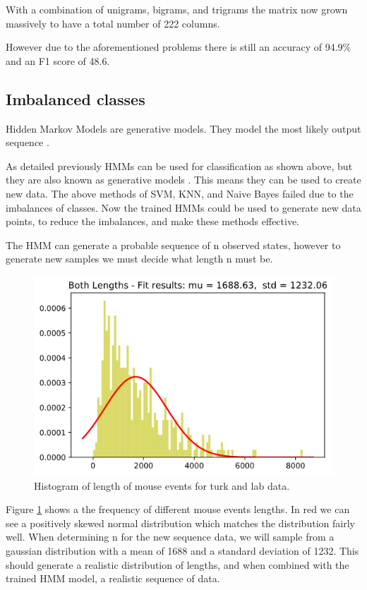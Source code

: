 \documentclass{article}
\begin{document}
With a combination of unigrams, bigrams, and trigrams the matrix now grown massively to have a total number of 222 columns.

However due to the aforementioned problems there is still an accuracy of 94.9\% and an F1 score of 48.6.


\subsection{Imbalanced classes}

Hidden Markov Models are generative models.
They model the most likely output sequence  \cite{ibe2013markov}.

As detailed previously HMMs can be used for classification as shown above, but they are also known as generative models \cite{ferrando2018generating}.
This means they can be used to create new data.
The above methods of SVM, KNN, and Naive Bayes failed due to the imbalances of classes.
Now the trained HMMs could be used to generate new data points, to reduce the imbalances, and make these methods effective.

The HMM can generate a probable sequence of n observed states, however to generate new samples we must decide what length n must be.


\begin{figure}[ht]
    \centering
    \includegraphics[scale=0.5]{Images/Lengths-Histogram.png}
    \caption{Histogram of length of mouse events for turk and lab data.}
    \label{fig:normaldis}
\end{figure}

Figure \ref{fig:normaldis} shows a the frequency of different mouse events lengths.
In red we can see a positively skewed normal distribution which matches the distribution fairly well.
When determining n for the new sequence data, we will sample from a gaussian distribution with a mean of 1688 and a standard deviation of 1232.
This should generate a realistic distribution of lengths, and when combined with the trained HMM model, a realistic sequence of data.
\end{document}
